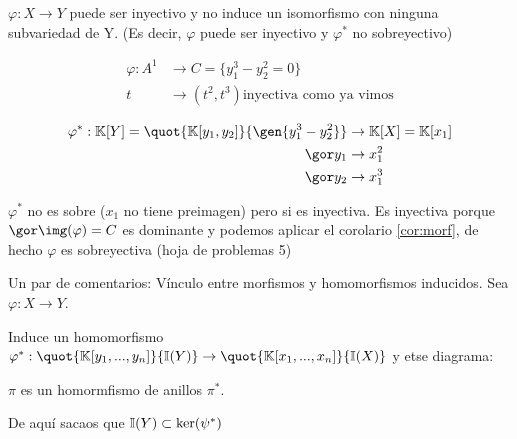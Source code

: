 \obs $\varphi: X \rightarrow Y$ puede ser inyectivo y no induce un isomorfismo con ninguna subvariedad de Y. (Es decir, $\varphi$ puede ser inyectivo y $\varphi^*$ no sobreyectivo)

\begin{example}

	\begin{align*}
		\varphi: A^1 & \rightarrow C=\{ y_1^3-y_2^2=0 \} \\
		t & \rightarrow (t^2,t^3) \text{inyectiva como ya vimos}
	\end{align*}

	\begin{align*}
		\varphi^*: \K[Y]=\quot{\K[y_1,y_2]}{\gen{y_1^3-y_2^2}} & \rightarrow \K[X]=\K[x_1] \\
		\cls{y_1} & \rightarrow x_1^2 \\
		\cls{y_2} & \rightarrow x_1^3
	\end{align*}

	$\varphi^*$ no es sobre ($x_1$ no tiene preimagen) pero si es inyectiva. Es inyectiva porque $\cls{\img(\varphi)}=C$  es dominante y podemos aplicar el corolario \ref{cor:morf}, de hecho $\varphi$ es sobreyectiva (hoja de problemas 5)
\end{example}

Un par de comentarios:
Vínculo entre morfismos y homomorfismos inducidos. Sea $\varphi:X \rightarrow Y$.

Induce un homomorfismo $\varphi^*: \quot{\K[y_1,...,y_n]}{\I(Y)} \rightarrow \quot{\K[x_1,...,x_n]}{\I(X)}$ y etse diagrama:


$\pi$ es un homormfismo de anillos $\pi^*$.

De aquí sacaos que $\mathbb{I}(Y) \subset \ker(\psi^*)$



